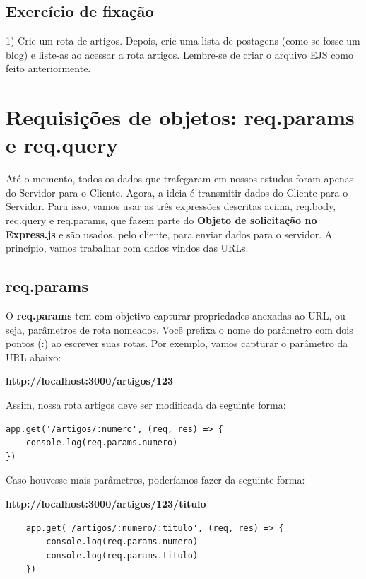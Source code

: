 \subsection{Exercício de fixação}

1) Crie um rota de artigos. Depois, crie uma lista de postagens (como se fosse um blog) e liste-as ao acessar a rota artigos. Lembre-se de criar o arquivo EJS como feito anteriormente. 

\section{Requisições de objetos: req.params e req.query}

Até o momento, todos os dados que trafegaram em nossos estudos foram apenas do Servidor para o Cliente. Agora, a ideia é transmitir dados do Cliente para o Servidor. Para isso, vamos usar as três expressões descritas acima, req.body, req.query e req.params, que fazem parte do \textbf{Objeto de solicitação no Express.js} e são usados, pelo cliente, para enviar dados para o servidor. A princípio, vamos trabalhar com dados vindos das URLs.

\subsection{req.params}

O \textbf{req.params} tem com objetivo capturar propriedades anexadas ao URL, ou seja, parâmetros de rota nomeados. Você prefixa o nome do parâmetro com dois pontos (:) ao escrever suas rotas. Por exemplo, vamos capturar o parâmetro da URL abaixo:

\textbf{http://localhost:3000/artigos/123}

Assim, nossa rota artigos deve ser modificada da seguinte forma:

\begin{verbatim}
app.get('/artigos/:numero', (req, res) => {
	console.log(req.params.numero)
})	
\end{verbatim}

Caso houvesse mais parâmetros, poderíamos fazer da seguinte forma:

\textbf{http://localhost:3000/artigos/123/titulo}

\begin{verbatim}
	app.get('/artigos/:numero/:titulo', (req, res) => {
		console.log(req.params.numero)
		console.log(req.params.titulo)
	})	
\end{verbatim}

